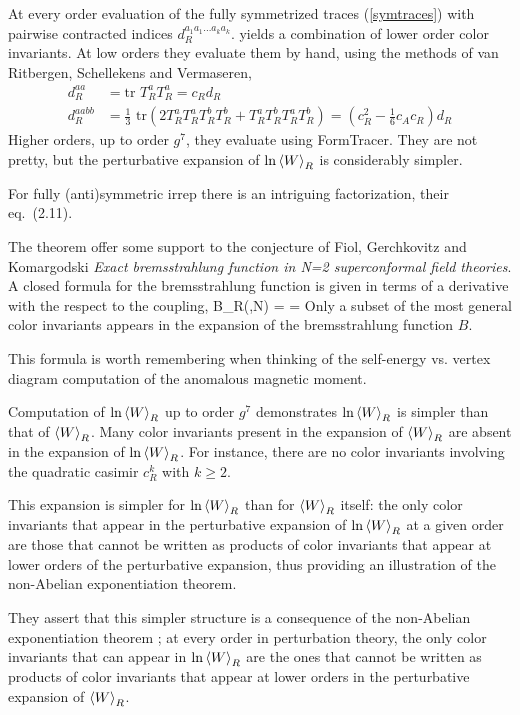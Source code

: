 At every order evaluation of the fully symmetrized traces
(\ref{symtraces}) with pairwise contracted indices $d_R^{a_1 a_1\dots a_k
a_k}$. yields a combination of lower order color invariants. At low
orders they evaluate them by hand, using the methods of van Ritbergen,
Schellekens and Vermaseren,
\begin{align*}
d_R^{aa} & =  \text{tr } T_R^a T_R^a= c_R d_R \\
d_R^{aabb} & =  \frac{1}{3}\text{ tr}
\left(2T_R^aT_R^aT_R^bT_R^b+T_R^aT_R^bT_R^aT_R^b\right)
=(c_R^2-\frac{1}{6}c_A c_R)d_R
\end{align*}
Higher orders, up to order $g^{7}$, they evaluate using
FormTracer. They are not pretty, but the perturbative
expansion of $\ln {\left< {W} \right>}_R$ is considerably simpler.

For  fully (anti)symmetric irrep
there is an intriguing factorization, their eq.~(2.11).


The theorem offer some support to the conjecture of
Fiol, Gerchkovitz and Komargodski
{\em Exact bremsstrahlung function in {N}=2 superconformal field theories}.
A closed formula for the bremsstrahlung function is given in terms of a
derivative with the respect to the coupling,
\beq
B_R(\lambda,N)
=\lambda {}
= \cdots
{}
Only a subset of the most general color invariants appears in the
expansion of the bremsstrahlung function $B$.

This formula is worth remembering when thinking of the self-energy vs.
vertex diagram computation of the anomalous magnetic moment.

Computation of $\ln {\left< {W} \right>}_R$ up to order $g^{7}$ demonstrates $\ln
{\left< {W} \right>}_R$ is simpler than that of ${\left< {W} \right>}_R$.
Many color invariants present in the expansion of ${\left< {W} \right>}_R$ are absent
in the expansion of $\ln {\left< {W} \right>}_R$. For instance, there are no color
invariants involving the quadratic casimir $c_R^k$ with $k\geq 2$.

This expansion is simpler
for $\ln {\left< {W} \right>}_R$ than for ${\left< {W} \right>}_R$ itself: the only color
invariants that appear in the perturbative expansion of $\ln {\left< {W} \right>}_R$
at a given order are those that cannot be written as products of color
invariants that appear at lower orders of the perturbative expansion,
thus providing an illustration of the non-Abelian exponentiation theorem.

They
assert that this
simpler structure is a consequence of the non-Abelian exponentiation
theorem%
; at every order in
perturbation theory, the only color invariants that can appear in $\ln
{\left< {W} \right>}_R$ are the ones that cannot be written as products of color
invariants that appear at lower orders in the perturbative expansion of
${\left< {W} \right>}_R$.

